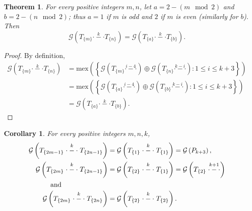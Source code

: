 \documentclass[12pt]{elsarticle}
\newtheorem{theorem}{Theorem}[section]
\newtheorem*{theorem A}{Theorem A}
\newtheorem*{theorem B}{N\"olker's Theorem}
\newtheorem{corollary}{Corollary}[section]
\theoremstyle{remark}
\theoremstyle{remark}
\theoremstyle{definition}
\begin{document}
\begin{theorem}
	For every positive integers $m,n$, let $a = 2 - \left(m \mod 2\right)$ and $b = 2 - \left(n \mod 2 \right)$; thus $a=1$ if $m$ is odd and $2$ if $m$ is even (similarly for $b$). Then
	\begin{equation*}
		\mathcal{G}\left(T_{\{m\}} \stackrel{k}{\cdot - \cdot} T_{\{n\}}\right) = \mathcal{G}\left(T_{\{a\}} \stackrel{k}{\cdot - \cdot} T_{\{b\}}\right).
	\end{equation*}
\end{theorem}
\begin{proof}
	By definition,
	\begin{align*}
		\mathcal{G}\left(T_{\{m\}} \stackrel{k}{\cdot - \cdot} T_{\{n\}}\right) &= \mathrm{mex}\left(\left\{\mathcal{G}\left(T_{\{m\}} \stackrel{i-4}{\cdot - \cdot}\right) \oplus \mathcal{G}\left(T_{\{n\}} \stackrel{k-i}{\cdot - \cdot}\right) : 1 \le i \le k+3 \right\}\right)\\
		&= \mathrm{mex}\left(\left\{\mathcal{G}\left(T_{\{a\}} \stackrel{i-4}{\cdot - \cdot}\right) \oplus \mathcal{G}\left(T_{\{b\}} \stackrel{k-i}{\cdot - \cdot}\right) : 1 \le i \le k+3 \right\}\right)\\
		&= \mathcal{G}\left(T_{\{a\}} \stackrel{k}{\cdot - \cdot} T_{\{b\}}\right).
	\end{align*}
\end{proof}
\begin{corollary}
	For every positive integers $m,n,k$, 
	\begin{align*}
		\mathcal{G}\left(T_{\{2m-1\}} \stackrel{k}{\cdot - \cdot} T_{\{2n-1\}}\right) &= \mathcal{G}\left(T_{\{1\}} \stackrel{k}{\cdot - \cdot} T_{\{1\}}\right) = \mathcal{G}\left(P_{k+3} \right),\\
		\mathcal{G}\left(T_{\{2m\}} \stackrel{k}{\cdot - \cdot} T_{\{2n-1\}}\right) &= \mathcal{G}\left(T_{\{2\}} \stackrel{k}{\cdot - \cdot} T_{\{1\}}\right) = \mathcal{G}\left(T_{\{2\}} \stackrel{k+1}{\cdot - \cdot} \right)\\
		 \intertext{\hspace{1cm} and}
		\mathcal{G}\left(T_{\{2m\}} \stackrel{k}{\cdot - \cdot} T_{\{2n\}}\right) &= \mathcal{G}\left(T_{\{2\}} \stackrel{k}{\cdot - \cdot} T_{\{2\}}\right).
	\end{align*}
\end{corollary}
\end{document}
